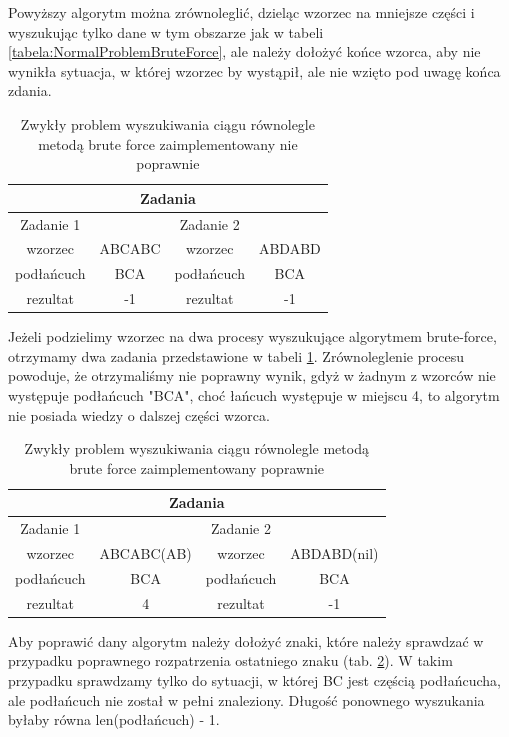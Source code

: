 Powyższy algorytm można zrównoleglić, dzieląc wzorzec na mniejsze części
i wyszukując tylko dane w tym obszarze jak w tabeli \ref{tabela:NormalProblemBruteForce}, 
ale należy dołożyć końce wzorca, aby nie wynikła sytuacja, w której wzorzec by
wystąpił, ale nie wzięto pod uwagę końca zdania. 

\begin{table}
  \centering
  \begin{tabular}{ |c|c||c|c|  } 
    \hline
    \multicolumn{4}{|c|}{Zadania} \\
    \hline
    Zadanie 1 & & Zadanie 2 & \\
    \hline
    wzorzec & ABCABC & wzorzec & ABDABD \\
    \hline
    podłańcuch & BCA & podłańcuch & BCA \\
    \hline
    rezultat & -1 & rezultat & -1 \\ 
    \hline
  \end{tabular}
  \caption{Zwykły problem wyszukiwania ciągu równolegle metodą brute force 
  zaimplementowany nie poprawnie}
  \label{tabela:splitTasksBruteForce}
\end{table}

Jeżeli podzielimy wzorzec na dwa procesy wyszukujące algorytmem brute-force,
otrzymamy dwa zadania przedstawione w tabeli \ref{tabela:splitTasksBruteForce}. Zrównoleglenie procesu 
powoduje, że otrzymaliśmy nie poprawny wynik, gdyż w żadnym z wzorców nie
występuje podłańcuch "BCA", choć łańcuch występuje w miejscu 4, to algorytm nie
posiada wiedzy o dalszej części wzorca.

\begin{table}
  \centering
  \begin{tabular}{ |c|c||c|c|  } 
    \hline
    \multicolumn{4}{|c|}{Zadania} \\
    \hline
    Zadanie 1 & & Zadanie 2 & \\
    \hline
    wzorzec & ABCABC(AB) & wzorzec & ABDABD(nil) \\
    \hline
    podłańcuch & BCA & podłańcuch & BCA \\
    \hline
    rezultat & 4 & rezultat & -1 \\ 
    \hline
  \end{tabular}
  \caption{Zwykły problem wyszukiwania ciągu równolegle metodą brute force 
  zaimplementowany poprawnie}
  \label{tabela:splitBruteForceCorrected}
\end{table}

Aby poprawić dany algorytm należy dołożyć znaki, które należy sprawdzać w 
przypadku poprawnego rozpatrzenia ostatniego znaku (tab.
\ref{tabela:splitBruteForceCorrected}). W takim przypadku sprawdzamy tylko do
sytuacji, w której BC jest częścią podłańcucha, ale podłańcuch nie został w 
pełni znaleziony. Długość ponownego wyszukania byłaby równa len(podłańcuch) - 1.


